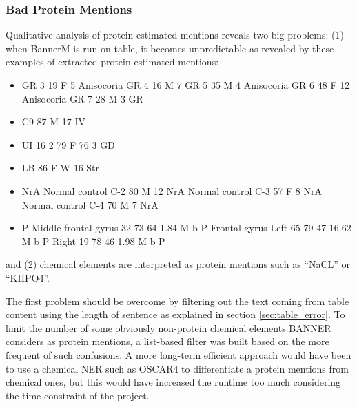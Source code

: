\subsubsection{Bad Protein Mentions}
Qualitative analysis of protein estimated mentions reveals two big problems: (1)
when BannerM is run on table, it becomes unpredictable as revealed by these examples of extracted protein estimated mentions:
\begin{itemize}
    \item GR 3 19 F 5 Anisocoria  GR 4 16 M 7 GR 5 35 M 4 Anisocoria  GR 6 48 F 12 Anisocoria GR 7 28 M 3  GR
    \item C9 87 M 17 IV
    \item UI 16 2 79 F 76 3 GD
    \item LB 86 F W 16 Str 
    \item NrA Normal control C-2 80 M 12 NrA Normal control C-3 57 F 8 NrA Normal control C-4 70 M 7 NrA
    \item P Middle frontal gyrus 32 73 64 1.84 M b P Frontal gyrus Left 65 79 47 16.62 M b P Right 19 78 46 1.98 M b P
\end{itemize}
and (2) chemical elements are interpreted as protein mentions such as ``NaCL'' or ``KHPO4''.

The first problem should be overcome by filtering out the text coming from table content using the
length of sentence as explained in section \ref{sec:table_error}.
To limit the number of some obviously non-protein chemical elements BANNER considers as protein mentions, a list-based filter was built based on the more frequent of such confusions. A more long-term efficient approach would have been to use a chemical NER such as OSCAR4 \cite{oscar} to differentiate a protein mentions from chemical ones, but this would have increased the runtime too much considering the time constraint of the project.
